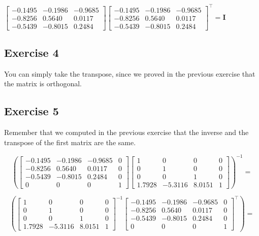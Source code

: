 \documentclass[11pt]{article}
\begin{document}
$
\begin{bmatrix}
-0.1495 & -0.1986 & -0.9685 \\
-0.8256 & 0.5640 & 0.0117 \\
-0.5439 & -0.8015 & 0.2484
\end{bmatrix}
\begin{bmatrix}
-0.1495 & -0.1986 & -0.9685 \\
-0.8256 & 0.5640 & 0.0117 \\
-0.5439 & -0.8015 & 0.2484
\end{bmatrix}^\intercal=\textbf{I}
$

\subsection{Exercise 4}

You can simply take the transpose, since we proved in the previous exercise that the matrix is orthogonal.

\subsection{Exercise 5}

Remember that we computed in the previous exercise that the inverse and the transpose of the first matrix are the same.

$$
\left(
\begin{bmatrix}
-0.1495 & -0.1986 & -0.9685 & 0 \\
-0.8256 & 0.5640 & 0.0117 & 0 \\
-0.5439 & -0.8015 & 0.2484 & 0 \\
0 & 0 & 0 & 1
\end{bmatrix}
\begin{bmatrix}
1 & 0 & 0 & 0 \\
0 & 1 & 0 & 0 \\
0 & 0 & 1 & 0 \\
1.7928 & -5.3116 & 8.0151 & 1 
\end{bmatrix}
\right)^{-1}=
$$

$$
\left(
\begin{bmatrix}
1 & 0 & 0 & 0 \\
0 & 1 & 0 & 0 \\
0 & 0 & 1 & 0 \\
1.7928 & -5.3116 & 8.0151 & 1 
\end{bmatrix}^{-1}
\begin{bmatrix}
-0.1495 & -0.1986 & -0.9685 & 0 \\
-0.8256 & 0.5640 & 0.0117 & 0 \\
-0.5439 & -0.8015 & 0.2484 & 0 \\
0 & 0 & 0 & 1
\end{bmatrix}^\intercal
\right)=
$$
\end{document}
